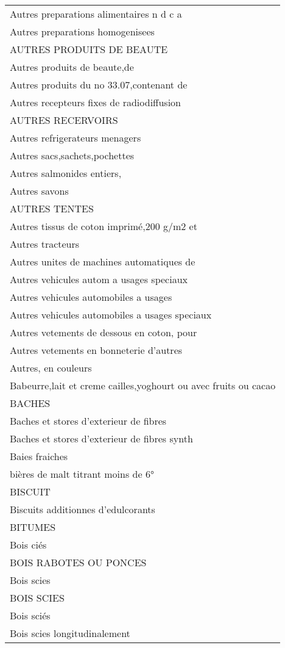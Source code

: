 \documentclass[
]{book}
\begin{document}
\begin{longtable}[t]{l}
Autres preparations alimentaires n d c a\\
Autres preparations homogenisees\\
AUTRES PRODUITS DE BEAUTE\\
\addlinespace
Autres produits de beaute,de\\
Autres produits du no 33.07,contenant de\\
Autres recepteurs fixes de radiodiffusion\\
AUTRES RECERVOIRS\\
Autres refrigerateurs menagers\\
\addlinespace
Autres sacs,sachets,pochettes\\
Autres salmonides entiers,\\
Autres savons\\
AUTRES TENTES\\
Autres tissus de coton imprimé,200 g/m2 et\\
\addlinespace
Autres tracteurs\\
Autres unites de machines automatiques de\\
Autres vehicules autom a usages speciaux\\
Autres vehicules automobiles a usages\\
Autres vehicules automobiles a usages speciaux\\
\addlinespace
Autres vetements de dessous en coton, pour\\
Autres vetements en bonneterie d'autres\\
Autres, en couleurs\\
Babeurre,lait et creme cailles,yoghourt ou avec fruits ou cacao\\
BACHES\\
\addlinespace
Baches et stores d'exterieur de fibres\\
Baches et stores d'exterieur de fibres synth\\
Baies fraiches\\
bières de malt titrant moins de 6°\\
BISCUIT\\
\addlinespace
Biscuits additionnes d'edulcorants\\
BITUMES\\
Bois ciés\\
BOIS RABOTES OU PONCES\\
Bois scies\\
\addlinespace
BOIS SCIES\\
Bois sciés\\
Bois scies longitudinalement\\

\end{longtable}
\end{document}
